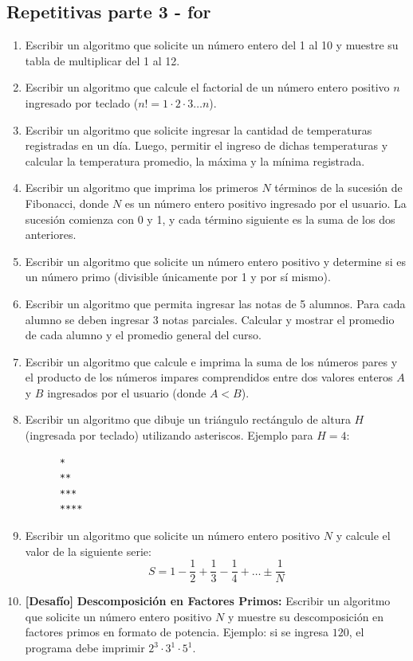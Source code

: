 \begin{ejercicioClase}
  \subsection*{Repetitivas parte 3 - for}
  \begin{enumerate}
    \item Escribir un algoritmo que solicite un número entero del 1 al 10 y muestre su tabla de multiplicar del 1 al 12.
    \item Escribir un algoritmo que calcule el factorial de un número entero positivo $n$ ingresado por teclado ($n! = 1 \cdot 2 \cdot 3 \dots n$).
    \item Escribir un algoritmo que solicite ingresar la cantidad de temperaturas registradas en un día. Luego, permitir el ingreso de dichas temperaturas y calcular la temperatura promedio, la máxima y la mínima registrada.
    \item Escribir un algoritmo que imprima los primeros $N$ términos de la sucesión de Fibonacci, donde $N$ es un número entero positivo ingresado por el usuario. La sucesión comienza con 0 y 1, y cada término siguiente es la suma de los dos anteriores.
    \item Escribir un algoritmo que solicite un número entero positivo y determine si es un número primo (divisible únicamente por 1 y por sí mismo).
    \item Escribir un algoritmo que permita ingresar las notas de 5 alumnos. Para cada alumno se deben ingresar 3 notas parciales. Calcular y mostrar el promedio de cada alumno y el promedio general del curso.
    \item Escribir un algoritmo que calcule e imprima la suma de los números pares y el producto de los números impares comprendidos entre dos valores enteros $A$ y $B$ ingresados por el usuario (donde $A < B$).
    \item Escribir un algoritmo que dibuje un triángulo rectángulo de altura $H$ (ingresada por teclado) utilizando asteriscos. Ejemplo para $H = 4$:
      \begin{verbatim}
      *
      **
      ***
      ****
      \end{verbatim}
    \item Escribir un algoritmo que solicite un número entero positivo $N$ y calcule el valor de la siguiente serie:
      \[ S = 1 - \frac{1}{2} + \frac{1}{3} - \frac{1}{4} + \dots \pm \frac{1}{N} \]
    \item \textbf{[Desafío]} \textbf{Descomposición en Factores Primos:} Escribir un algoritmo que solicite un número entero positivo $N$ y muestre su descomposición en factores primos en formato de potencia. Ejemplo: si se ingresa $120$, el programa debe imprimir $2^3 \cdot 3^1 \cdot 5^1$.

\end{enumerate}
\end{ejercicioClase}
